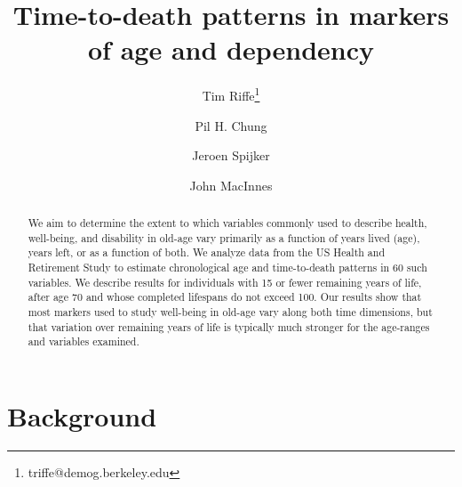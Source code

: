 \documentclass{article}
\begin{document}
\title{Time-to-death patterns in markers of age and dependency}

\author[1]{Tim Riffe\thanks{triffe@demog.berkeley.edu}}
\author[1]{Pil H. Chung}
\author[2,3]{Jeroen Spijker}
\author[4]{John MacInnes}

\maketitle

\begin{abstract}
We aim to determine the extent to which variables commonly
used to describe health, well-being, and disability in old-age vary primarily
as a function of years lived (age), years left, or as a function of both. We analyze data from the US Health and Retirement Study to estimate
chronological age and time-to-death patterns in 60 such variables. We describe
results for individuals with 15 or fewer remaining years of life, after age 70
and whose completed lifespans do not exceed 100. Our results show that most
markers used to study well-being in old-age vary along both time dimensions, but
that variation over remaining years of life is typically much stronger for
the age-ranges and variables examined.
\end{abstract}

\section*{Background}
\end{document}
